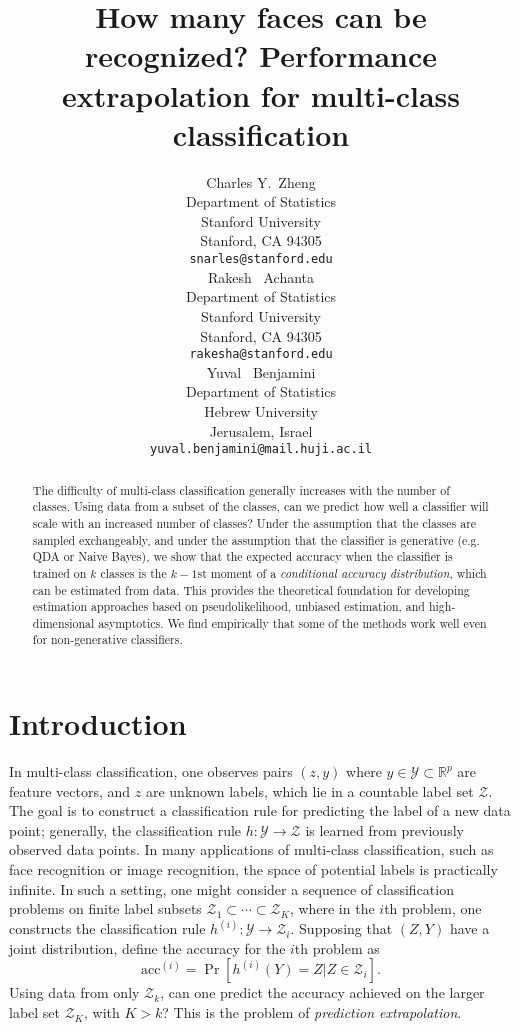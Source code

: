 \documentclass{article}
\title{How many faces can be recognized? Performance extrapolation for
  multi-class classification}
\author{
  Charles Y.~Zheng \\
  Department of Statistics\\
  Stanford University\\
  Stanford, CA 94305 \\
  \texttt{snarles@stanford.edu} \\
  \And
  Rakesh ~Achanta \\
  Department of Statistics\\
  Stanford University\\
  Stanford, CA 94305 \\
  \texttt{rakesha@stanford.edu} \\
  \And
  Yuval ~Benjamini \\
  Department of Statistics \\
  Hebrew University\\
  Jerusalem, Israel\\
  \texttt{yuval.benjamini@mail.huji.ac.il}
}
\begin{document}

\maketitle

\begin{abstract}
The difficulty of multi-class classification generally increases with
the number of classes.  Using data from a subset of the classes, 
can we predict how well a classifier will scale with an
increased number of classes?  Under the assumption that the classes
are sampled exchangeably, and under the assumption that
the classifier is generative (e.g. QDA or Naive Bayes), we show that the expected accuracy
when the classifier is trained on $k$ classes is the $k-1$st moment
of a \emph{conditional accuracy distribution}, which can be estimated from data.
This provides the theoretical foundation for developing estimation approaches based on pseudolikelihood, 
unbiased estimation, and high-dimensional asymptotics.
We find empirically that some of the methods work well even for non-generative classifiers.
\end{abstract}

\section{Introduction}

In multi-class classification, one observes pairs $(z, y)$ where $y \in \mathcal{Y} \subset \mathbb{R}^p$ are feature vectors,
and $z$ are unknown labels, which lie in a countable label set $\mathcal{Z}$.  The goal is to construct a classification rule for
predicting the label of a new data point; generally, the classification rule $h: \mathcal{Y} \to \mathcal{Z}$
is learned from previously observed data points.  In many applications of multi-class classification,
such as face recognition or image recognition, the space of potential labels is practically infinite.
In such a setting, one might consider a sequence of classification problems on finite label subsets $\mathcal{Z}_1 \subset \cdots \subset \mathcal{Z}_K$, where in the $i$th problem, one constructs the classification rule $h^{(i)}:\mathcal{Y} \to \mathcal{Z}_i$.
Supposing that $(Z, Y)$ have a joint distribution, define the accuracy for the $i$th problem as
\[
\text{acc}^{(i)} = \Pr[h^{(i)}(Y) = Z|Z \in \mathcal{Z}_i].
\]
Using data from only $\mathcal{Z}_k$, can one predict the accuracy achieved on the larger label set $\mathcal{Z}_K$, with $K> k$?  This is the problem of \emph{prediction extrapolation}.
\end{document}
